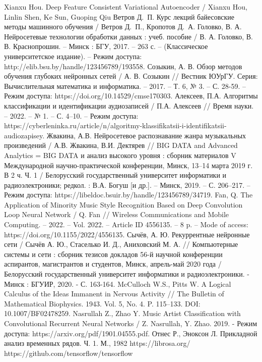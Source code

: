 \begin{thebibliography}{99}
 Xianxu Hou. Deep Feature Consistent Variational Autoencoder / Xianxu Hou, Linlin Shen, Ke Sun, Guoping Qiu
 Ветров Д.~П. Курс лекций байесовские методы машинного обучения / Ветров Д.~П., Кропотов Д.~А.
 Головко, В. А. Нейросетевые технологии обработки данных : учеб. пособие / В. А. Головко, В. В. Краснопрошин. – Минск : БГУ, 2017. – 263 с. – (Классическое университетское издание). – Режим доступа: http://elib.bsu.by/handle/123456789/193558.
 Созыкин, А. В. Обзор методов обучения глубоких нейронных сетей / А. В. Созыкин // Вестник ЮУрГУ. Серия: Вычислительная математика и информатика. – 2017. – Т. 6, № 3. – С. 28-59. – Режим доступа: https://doi.org/10.14529/cmse170303.
 Алексеев, П.А. Алгоритмы классификации и идентификации аудиозаписей / П.А. Алексеев // Время науки. – 2022. – № 1. – С. 4–10. – Режим доступа: https://cyberleninka.ru/article/n/algoritmy-klassifikatsii-i-identifikatsii-audiozapisey.
 Жвакина, А.В. Нейросетевое распознавание жанра музыкальных произведений / А.В.  Жвакина, В.И. Дектярев // BIG DATA and Advanced Analytics = BIG DATA и анализ высокого уровня : сборник материалов V Международной научно-практической конференции, Минск, 13–14 марта 2019 г. В 2 ч. Ч. 1 / Белорусский государственный университет информатики и радиоэлектроники; редкол. : В.А. Богуш [и др.]. – Минск, 2019. – С. 206–217. – Режим доступа: https://libeldoc.bsuir.by/handle/123456789/34719.
 Fan, Q. The Application of Minority Music Style Recognition Based on Deep Convolution Loop Neural Network / Q. Fan // Wireless Communications and Mobile Computing. – 2022. – Vol. 2022. – Article ID 4556135. – 8 p. – Mode of access: https://doi.org/10.1155/2022/4556135.
 Сычёв, А. Ю. Рекуррентные нейронные сети / Сычёв А. Ю., Стаселько И. Д., Аниховский М. А. // Компьютерные системы и сети : сборник тезисов докладов 56-й научной конференции аспирантов, магистрантов и студентов, Минск, апрель-май 2020 года / Белорусский государственный университет информатики и радиоэлектроники. - Минск : БГУИР, 2020. - С. 163-164.
 McCulloch W.S., Pitts W. A Logical Calculus of the Ideas Immanent in Nervous Activity // The Bulletin of Mathematical Biophysics. 1943. Vol. 5, No. 4. P. 115–133.  DOI: 10.1007/BF02478259.
 Nasrullah Z., Zhao Y. Music Artist Classification with Convolutional Recurrent Neural Networks / Z. Nasrullah, Y. Zhao. 2019. - Режим доступа: https://arxiv.org/pdf/1901.04555.pdf.
 Отнес Р., Эноксон Л. Прикладной анализ временных рядов. Ч. 1. М., 1982
 https://librosa.org/
 https://github.com/tensorflow/tensorflow
\end{thebibliography}
